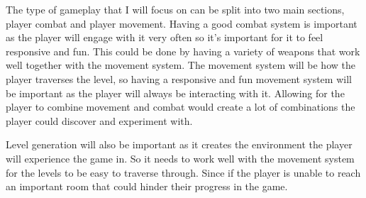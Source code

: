 \documentclass{article}
\newcommand{\parBr}{\vspace{5mm}}%
\begin{document}
\parBr

The type of gameplay that I will focus on can be split into two main sections, player combat and player movement. \linebreak
Having a good combat system is important as the player will engage with it very often so it's important for it to feel responsive and fun. This could be done by having a variety of weapons that work well together with the movement system. \linebreak
The movement system will be how the player traverses the level, so having a responsive and fun movement system will be important as the player will always be interacting with it. Allowing for the player to combine movement and combat would create a lot of combinations the player could discover and experiment with.

\parBr

Level generation will also be important as it creates the environment the player will experience the game in. So it needs to work well with the movement system for the levels to be easy to traverse through. Since if the player is unable to reach an important room that could hinder their progress in the game.  
\end{document}
